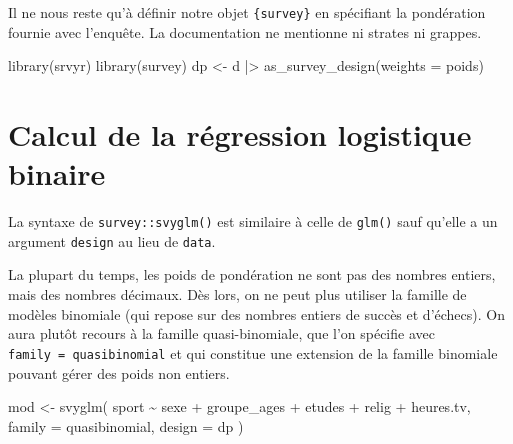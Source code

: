 \documentclass[
  letterpaper,
  DIV=11,
  numbers=noendperiod,
  oneside]{scrreprt}
\newenvironment{Shaded}{\begin{snugshade}}{\end{snugshade}}
\newcommand{\AttributeTok}[1]{\textcolor[rgb]{0.40,0.45,0.13}{#1}}
\newcommand{\FunctionTok}[1]{\textcolor[rgb]{0.28,0.35,0.67}{#1}}
\newcommand{\NormalTok}[1]{\textcolor[rgb]{0.00,0.23,0.31}{#1}}
\newcommand{\OtherTok}[1]{\textcolor[rgb]{0.00,0.23,0.31}{#1}}
\newcommand{\SpecialCharTok}[1]{\textcolor[rgb]{0.37,0.37,0.37}{#1}}
\begin{document}
Il ne nous reste qu'à définir notre objet \texttt{\{survey\}} en
spécifiant la pondération fournie avec l'enquête. La documentation ne
mentionne ni strates ni grappes.

\begin{Shaded}
\begin{Highlighting}[]
\FunctionTok{library}\NormalTok{(srvyr)}
\FunctionTok{library}\NormalTok{(survey)}
\NormalTok{dp }\OtherTok{\textless{}{-}}\NormalTok{ d }\SpecialCharTok{|\textgreater{}} 
  \FunctionTok{as\_survey\_design}\NormalTok{(}\AttributeTok{weights =}\NormalTok{ poids)}
\end{Highlighting}
\end{Shaded}

\hypertarget{calcul-de-la-ruxe9gression-logistique-binaire-1}{%
\section{Calcul de la régression logistique
binaire}\label{calcul-de-la-ruxe9gression-logistique-binaire-1}}

La syntaxe de \texttt{survey::svyglm()} est similaire à celle de
\texttt{glm()} sauf qu'elle a un argument \texttt{design} au lieu de
\texttt{data}.

La plupart du temps, les poids de pondération ne sont pas des nombres
entiers, mais des nombres décimaux. Dès lors, on ne peut plus utiliser
la famille de modèles binomiale (qui repose sur des nombres entiers de
succès et d'échecs). On aura plutôt recours à la famille
quasi-binomiale, que l'on spécifie avec
\texttt{family\ =\ quasibinomial} et qui constitue une extension de la
famille binomiale pouvant gérer des poids non entiers.

\begin{Shaded}
\begin{Highlighting}[]
\NormalTok{mod }\OtherTok{\textless{}{-}} \FunctionTok{svyglm}\NormalTok{(}
\NormalTok{  sport }\SpecialCharTok{\textasciitilde{}}\NormalTok{ sexe }\SpecialCharTok{+}\NormalTok{ groupe\_ages }\SpecialCharTok{+}\NormalTok{ etudes }\SpecialCharTok{+}\NormalTok{ relig }\SpecialCharTok{+}\NormalTok{ heures.tv,}
  \AttributeTok{family =}\NormalTok{ quasibinomial,}
  \AttributeTok{design =}\NormalTok{ dp}
\NormalTok{)}
\end{Highlighting}
\end{Shaded}
\end{document}
